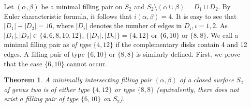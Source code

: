 \documentclass[11pt,reqno]{amsart}
\theoremstyle{plain}
\newtheorem{theorem}{Theorem}[section]
\theoremstyle{definition}
\theoremstyle{remark}
\numberwithin{equation}{section}
\numberwithin{figure}{section}
\begin{document}
Let $(\alpha, \beta)$ be a minimal filling pair on $S_2$ and
$S_2\setminus (\alpha\cup \beta)=D_1 \sqcup D_2.$
By Euler characteristic formula, it follows that $i(\alpha,\beta)=4$. It is easy to see that $|D_1|+|D_2|=16$, where $|D_i|$ denotes the number of edges in $D_i, i=1,2$. As $|D_1|,|D_2| \in \{ 4,6,8,10,12\}$, $\{|D_1|,|D_2|\}=\{4,12\} \text{ or } \{6,10\} \text{ or } \{8,8\}$. We call a minimal filling pair as \emph{of type} $\{ 4,12 \}$ if the complementary disks contain 4 and 12 edges. A filling pair of type $\{6,10\} \text{ or } \{8,8\}$ is similarly defined. First, we prove that the case $\{6,10\}$ cannot occur.

\begin{theorem}
   A minimally intersecting filling pair $(\alpha, \beta)$ of a closed surface $S_2$ of genus two is of either type $\{4, 12\}$ or type $\{8,8\}$ (equivalently, there does not exist a filling pair of type $\{6,10\}$ on $S_2$).
\end{theorem}
\end{document}
